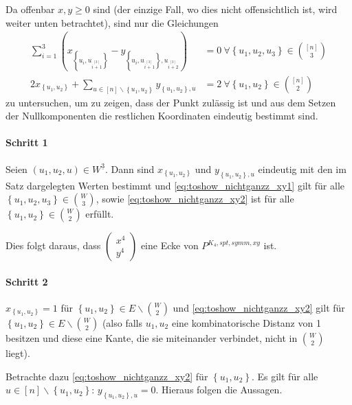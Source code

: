 \documentclass[10p,a4paper,BCOR = 12mm, DIV=15]{scrbook}
\begin{document}
\begin{bew}
Da offenbar $x, y \geq 0$ sind (der einzige Fall, wo dies nicht offensichtlich ist, wird weiter unten betrachtet), sind nur die Gleichungen 
\begin{align}
\sum_{i=1}^3 \left(x_{\left\{u_{i}, u_{i \stackrel{\left[3\right]}{+} 1}\right\}} -  y_{\left\{u_{i}, u_{i \stackrel{\left[3\right]}{+} 1}\right\}, u_{i \stackrel{\left[3\right]}{+} 2}}\right) & = 0\ \forall \left\{u_1, u_2, u_3\right\}\in {[n] \choose 3} \label{eq:toshow_nichtganzz_xy1} \\
2 x_{\left\{u_1, u_2\right\}} + \sum_{u\in[n]\backslash\left\{u_1, u_2\right\}} y_{\left\{u_1, u_2\right\}, u} & = 2\ \forall \left\{u_1, u_2\right\}\in {[n] \choose 2} \label{eq:toshow_nichtganzz_xy2}
\end{align}
zu untersuchen, um zu zeigen, dass der Punkt zulässig ist und aus dem Setzen der Nullkomponenten die restlichen Koordinaten eindeutig bestimmt sind.

\paragraph{Schritt 1}
Seien $\left(u_1, u_2, u\right) \in W^{\underline{3}}$. Dann sind  $x_{\left\{u_1, u_2\right\}}$ und $y_{\left\{u_1, u_2\right\}, u}$ eindeutig mit den im Satz dargelegten Werten bestimmt und \eqref{eq:toshow_nichtganzz_xy1} gilt für alle $\left\{u_1, u_2, u_3\right\}\in {W \choose 3}$, sowie \eqref{eq:toshow_nichtganzz_xy2} ist für alle $\left\{u_1, u_2\right\}\in {W \choose 2}$ erfüllt.

Dies folgt daraus, dass $\left(
\begin{array}{c}
x^{4} \\
y^{4}
\end{array}
\right)$ eine Ecke von $P^{K_4, spt, symm, xy}$ ist.

\paragraph{Schritt 2}
$x_{\left\{u_1, u_2\right\}} = 1$ für $\left\{u_1, u_2\right\} \in E \backslash {W \choose 2}$ und \eqref{eq:toshow_nichtganzz_xy2} gilt für $\left\{u_1, u_2\right\} \in E \backslash {W \choose 2}$ (also falls $u_1, u_2$ eine kombinatorische Distanz von 1 besitzen und diese eine Kante, die sie miteinander verbindet, nicht in $W \choose 2$ liegt).

Betrachte dazu \eqref{eq:toshow_nichtganzz_xy2} für $\left\{u_1, u_2\right\}$. Es gilt für alle $u \in \left[n\right] \backslash \left\{u_1, u_2\right\}$: $y_{\left\{u_1, u_2\right\}, u} = 0$. Hieraus folgen die Aussagen.


\end{bew}
\end{document}
